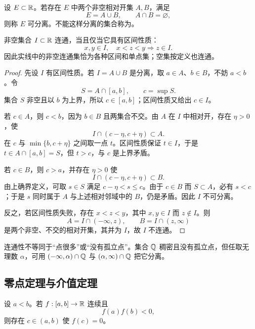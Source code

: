 \begin{definition}[相对分离与连通]
设 \(E\subset\mathbb{R}\)。若存在 \(E\) 中两个非空相对开集 \(A,B\)，满足
\[
 E=A\cup B,\qquad A\cap B=\varnothing,
\]
则称 \(E\) 可分离。不能这样分离的集合称为。
\end{definition}

\begin{theorem}[实线连通集的刻画]
非空集合 \(I\subset\mathbb{R}\) 连通，当且仅当它具有区间性质：
\[
 x,y\in I,\quad x<z<y\Longrightarrow z\in I.
\]
因此实线中的非空连通集恰为各种区间和单点集；空集按定义也连通。
\end{theorem}

\begin{proof}
先设 \(I\) 有区间性质。若 \(I=A\cup B\) 是分离，取 \(a\in A\)、\(b\in B\)，不妨 \(a<b\)。令
\[
 S=A\cap[a,b],\qquad c=\sup S.
\]
集合 \(S\) 非空且以 \(b\) 为上界，所以 \(c\in[a,b]\)；区间性质又给出 \(c\in I\)。

若 \(c\in A\)，则 \(c<b\)，因为 \(b\in B\) 且两集合不交。由 \(A\) 在 \(I\) 中相对开，存在 \(\eta>0\)，使
\[
 I\cap(c-\eta,c+\eta)\subset A.
\]
在 \(c\) 与 \(\min\{b,c+\eta\}\) 之间取一点 \(t\)。区间性质保证 \(t\in I\)，于是 \(t\in A\cap[a,b]=S\)，但 \(t>c\)，与 \(c\) 是上界矛盾。

若 \(c\in B\)，则 \(c>a\)，并存在 \(\eta>0\) 使
\[
 I\cap(c-\eta,c+\eta)\subset B.
\]
由上确界定义，可取 \(s\in S\) 满足 \(c-\eta<s\le c\)。由于 \(c\in B\) 而 \(S\subset A\)，必有 \(s<c\)；于是 \(s\) 同时属于 \(A\) 与上述相对邻域中的 \(B\)，仍是矛盾。因此 \(I\) 不可分离。

反之，若区间性质失败，存在 \(x<z<y\)，其中 \(x,y\in I\) 而 \(z\notin I\)。则
\[
 A=I\cap(-\infty,z),\qquad B=I\cap(z,\infty)
\]
是两个非空、不交的相对开集，其并为 \(I\)，故 \(I\) 不连通。
\end{proof}

\begin{remark}
连通性不等同于“点很多”或“没有孤立点”。集合 \(\mathbb{Q}\) 稠密且没有孤立点，但任取无理数 \(\alpha\)，可用 \((-\infty,\alpha)\cap\mathbb{Q}\) 与 \((\alpha,\infty)\cap\mathbb{Q}\) 把它分离。
\end{remark}

\subsection{零点定理与介值定理}

\begin{theorem}
设 \(a<b\)。若 \(f:[a,b]\to\mathbb{R}\) 连续且
\[
 f(a)f(b)<0,
\]
则存在 \(c\in(a,b)\) 使 \(f(c)=0\)。
\end{theorem}

